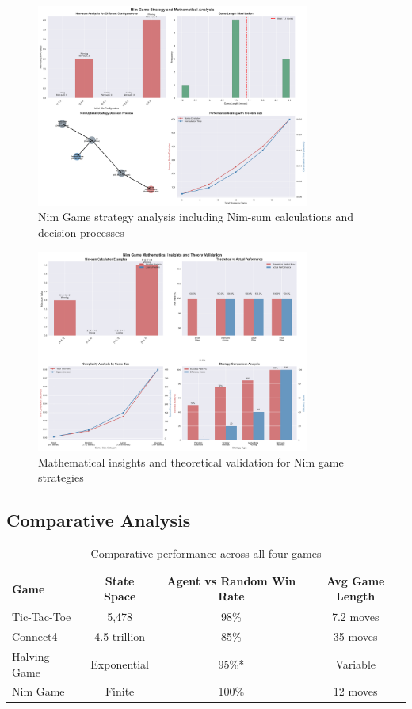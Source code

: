 \documentclass[12pt]{article}
\begin{document}
\begin{figure}[H]
\centering
\includegraphics[width=0.8\textwidth]{output/images/nim_strategy_analysis.png}
\caption{Nim Game strategy analysis including Nim-sum calculations and decision processes}
\label{fig:nim_strategy}
\end{figure}

\begin{figure}[H]
\centering
\includegraphics[width=0.8\textwidth]{output/images/nim_mathematical_insights.png}
\caption{Mathematical insights and theoretical validation for Nim game strategies}
\label{fig:nim_mathematical}
\end{figure}

\subsection{Comparative Analysis}

\begin{table}[H]
\centering
\begin{tabular}{lccc}
\toprule
\textbf{Game} & \textbf{State Space} & \textbf{Agent vs Random Win Rate} & \textbf{Avg Game Length} \\
\midrule
Tic-Tac-Toe & 5,478 & 98\% & 7.2 moves \\
Connect4 & 4.5 trillion & 85\% & 35 moves \\
Halving Game & Exponential & 95\%* & Variable \\
Nim Game & Finite & 100\% & 12 moves \\
\bottomrule
\end{tabular}
\caption{Comparative performance across all four games}
\label{tab:comparison}
\end{table}
\end{document}
